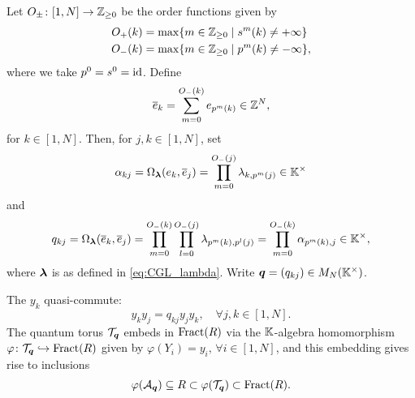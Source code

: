 Let $O_{\pm} \colon [1, N] \to \mathbb{Z}_{\geq 0}$ be the order
functions given by
\begin{align*}
	O_{+}(k) & = \max\{m \in \mathbb{Z}_{\geq 0} \mid s^m(k) \neq + \infty\}   \\
	O_{-}(k) & = \max\{m \in \mathbb{Z}_{\geq 0} \mid p^m(k) \neq - \infty\} ,
\end{align*}
%
where we take $p^0 = s^0 = \operatorname{id}$. Define
\begin{equation*}
	\overline{e}_k = \sum_{m=0}^{O_{-}(k)} e_{p^m(k)} \in \mathbb{Z}^N,
\end{equation*}
%
for $k \in [1, N]$. Then, for $j,k \in [1, N]$, set
\begin{equation*}
	\alpha_{kj} = \Omega_{\boldsymbol{\lambda}}(e_k, \overline{e}_j) = \prod_{m=0}^{O_{-}(j)}\lambda_{k, p^m(j)} \in \mathbb{K}^\times
\end{equation*}
and
\begin{equation*}
	q_{kj} = \Omega_{\boldsymbol{\lambda}}(\overline{e}_k, \overline{e}_j) = \prod_{m=0}^{O_{-}(k)}\prod_{l=0}^{O_{-}(j)}\lambda_{p^m(k),p^l(j)} = \prod_{m=0}^{O_{-}(k)}\alpha_{p^m (k),j} \in \mathbb{K}^\times,
\end{equation*}
%
where $\boldsymbol{\lambda}$ is as defined in \cref{eq:CGL_lambda}. Write $\boldsymbol{q} = (q_{kj}) \in
	M_N(\mathbb{K}^\times)$.
\begin{proposition}\label{prop:y_quantum_torus}
	The $y_k$ quasi-commute:
	\begin{equation}\label{eq:y_quasi_commute}
		y_k y_j = q_{kj}y_jy_k, \quad \forall j, k \in [1, N].
	\end{equation}
	The quantum torus $\mathcal{T}_{\boldsymbol{q}}$ embeds in $\operatorname{Fract}(R)$ via the $\mathbb{K}$-algebra
	homomorphism $\varphi \colon \mathcal{T}_{\boldsymbol{q}} \hookrightarrow \operatorname{Fract}(R)$ given by $\varphi(Y_i) =
		y_i,\,\forall i \in [1, N]$, and this embedding gives rise to inclusions
	\begin{equation*}
		\varphi(\mathcal{A}_{\boldsymbol{q}}) \subseteq R \subset \varphi(\mathcal{T}_{\boldsymbol{q}}) \subset \operatorname{Fract}(R).
	\end{equation*}
\end{proposition}


